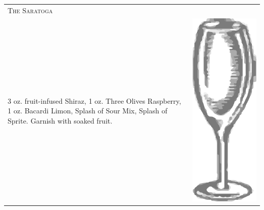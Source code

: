 \documentclass{article}
\begin{document}
\begin{tabular}{p{2in} p{0.5in}}
  \multicolumn{2}{p{3in}}{\centering\Huge\textsc{The Saratoga}} \\ 
  
   \vspace{-0.1in}3 oz. fruit-infused Shiraz, 1 oz. Three Olives Raspberry, 1
    oz. Bacardi Limon, Splash of Sour Mix, Splash of Sprite. Garnish
    with soaked fruit. &
   \vspace{-0.1in} \includegraphics{wine_glass.png}
\end{tabular}
\end{document}
